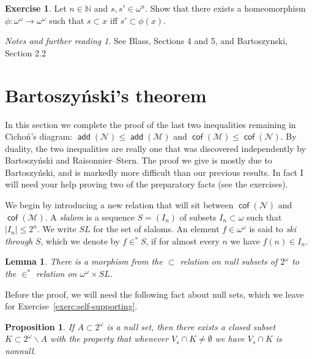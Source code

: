 \documentclass[11pt,oneside,a4paper]{amsbook}
\newcommand{\N}{\mathbb N}
\newcommand{\Null}{\mathcal N}
\newcommand{\Meager}{\mathcal M}
\DeclareMathOperator{\add}{\mathsf{add}}
\DeclareMathOperator{\cof}{\mathsf{cof}}
\theoremstyle{definition}
\newtheorem{exercise}{Exercise}[section]
\theoremstyle{plain}
\newtheorem{lemma}[theorem]{Lemma}
\newtheorem{proposition}[theorem]{Proposition}
\theoremstyle{definition}
\theoremstyle{remark}
\newtheorem*{notes}{Notes and further reading}
\numberwithin{equation}{section}
\numberwithin{figure}{section}
\begin{document}
\begin{exercise}
  \label{exerc:homeo}
  Let $n\in\N$ and $s,s'\in\omega^n$. Show that there exists a homeomorphism $\phi\colon\omega^\omega\to\omega^\omega$ such that $s\subset x$ iff $s'\subset\phi(x)$.
\end{exercise}

\begin{notes}
  See Blass, Sections 4 and 5, and Bartoszynski, Section 2.2
\end{notes}


\newpage
\section{Bartoszy\'nski's theorem}

In this section we complete the proof of the last two inequalities remaining in Cicho\'n's diagram: $\add(\Null)\leq\add(\Meager)$ and $\cof(\Meager)\leq\cof(\Null)$. By duality, the two inequalities are really one that was discovered independently by Bartoszy\'nski and Raisonnier--Stern. The proof we give is mostly due to Bartoszy\'nski, and is markedly more difficult than our previous results. In fact I will need your help proving two of the preparatory facts (see the exercises).

We begin by introducing a new relation that will sit between $\cof(\Null)$ and $\cof(\Meager)$. A \emph{slalom} is a sequence $S=(I_n)$ of subsets $I_n\subset\omega$ such that $|I_n|\leq2^n$. We write $SL$ for the set of slaloms. An element $f\in\omega^\omega$ is said to \emph{ski through} $S$, which we denote by $f\in^*S$, if for almost every $n$ we have $f(n)\in I_n$.

\begin{lemma}
  \label{lem:null-slalom}
  There is a morphism from the $\subset$ relation on null subsets of $2^\omega$ to the $\in^*$ relation on $\omega^\omega\times SL$.
\end{lemma}

Before the proof, we will need the following fact about null sets, which we leave for Exercise~\ref{exerc:self-supporting}.

\begin{proposition}
  \label{prop:self-supporting}
  If $A\subset2^\omega$ is a null set, then there exists a closed subset $K\subset2^\omega\smallsetminus A$ with the property that whenever $V_s\cap K\neq\emptyset$ we have $V_s\cap K$ is nonnull.
\end{proposition}
\end{document}
